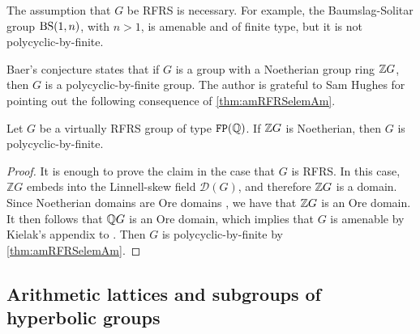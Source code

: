 \documentclass[11pt, letterpaper]{amsart}
\begin{document}
\begin{rem}
The assumption that $G$ be RFRS is necessary. For example, the Baumslag-Solitar group $\mathrm{BS}(1,n)$, with $n > 1$, is amenable and of finite type, but it is not polycyclic-by-finite.
\end{rem}

Baer's conjecture states that if $G$ is a group with a Noetherian group ring $\mathbb{Z} G$, then $G$ is a polycyclic-by-finite group. The author is grateful to Sam Hughes for pointing out the following consequence of \cref{thm:amRFRSelemAm}.

\begin{cor}\label{cor:baer}
Let $G$ be a virtually RFRS group of type $\mathtt{FP}(\mathbb{Q})$. If $\mathbb{Z} G$ is Noetherian, then $G$ is polycyclic-by-finite.
\end{cor}
\begin{proof}
It is enough to prove the claim in the case that $G$ is RFRS. In this case, $\mathbb{Z} G$ embeds into the Linnell-skew field $\mathcal{D}(G)$, and therefore $\mathbb{Z} G$ is a domain. Since Noetherian domains are Ore domains \cite[p.~47]{McConnellRobsonNNR}, we have that $\mathbb{Z} G$ is an Ore domain. It then follows that $\mathbb{Q} G$ is an Ore domain, which implies that $G$ is amenable by Kielak's appendix to \cite{BartholdiKielakApp}. Then $G$ is polycyclic-by-finite by \cref{thm:amRFRSelemAm}.
\end{proof}







\subsection{Arithmetic lattices and subgroups of hyperbolic groups}
\end{document}
